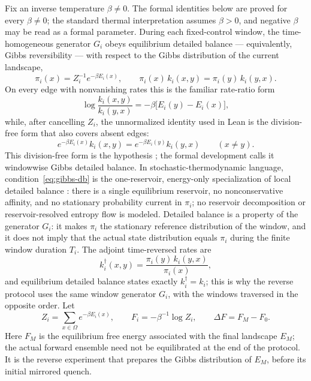 Fix an inverse temperature $\beta\ne 0$. The formal identities below are proved for every $\beta\ne0$; the standard thermal interpretation assumes $\beta>0$, and negative $\beta$ may be read as a formal parameter. During each fixed-control window, the time-homogeneous generator $G_i$ obeys equilibrium detailed balance --- equivalently, Gibbs reversibility --- with respect to the Gibbs distribution of the current landscape,
\[
  \pi_i(x)=Z_i^{-1}e^{-\beta E_i(x)},
  \qquad
  \pi_i(x)\,k_i(x,y)=\pi_i(y)\,k_i(y,x).
\]
On every edge with nonvanishing rates this is the familiar rate-ratio form
\[
  \log\frac{k_i(x,y)}{k_i(y,x)}
  =-\beta\bigl[E_i(y)-E_i(x)\bigr],
\]
while, after cancelling $Z_i$, the unnormalized identity used in Lean is the division-free form that also covers absent edges:
\begin{equation}
\label{eq:gibbs-db}
  e^{-\beta E_i(x)} k_i(x,y)
  = e^{-\beta E_i(y)} k_i(y,x)
  \qquad (x\ne y).
\end{equation}
This division-free form is the hypothesis ; the formal development calls it windowwise Gibbs detailed balance. In stochastic-thermodynamic language, condition~\eqref{eq:gibbs-db} is the one-reservoir, energy-only specialization of local detailed balance \parencite{Maes2021}: there is a single equilibrium reservoir, no nonconservative affinity, and no stationary probability current in $\pi_i$; no reservoir decomposition or reservoir-resolved entropy flow is modeled. Detailed balance is a property of the generator $G_i$: it makes $\pi_i$ the stationary reference distribution of the window, and it does not imply that the actual state distribution equals $\pi_i$ during the finite window duration $T_i$. The adjoint time-reversed rates are
\[
  k_i^{\dagger}(x,y)=\frac{\pi_i(y)\,k_i(y,x)}{\pi_i(x)},
\]
and equilibrium detailed balance states exactly $k_i^{\dagger}=k_i$; this is why the reverse protocol uses the same window generator $G_i$, with the windows traversed in the opposite order. Let
\[
  Z_i=\sum_{x\in\Omega}e^{-\beta E_i(x)},
  \qquad
  F_i=-\beta^{-1}\log Z_i,
  \qquad
  \Delta F=F_M-F_0.
\]
Here $F_M$ is the equilibrium free energy associated with the final landscape $E_M$; the actual forward ensemble need not be equilibrated at the end of the protocol. It is the reverse experiment that prepares the Gibbs distribution of $E_M$, before its initial mirrored quench.

